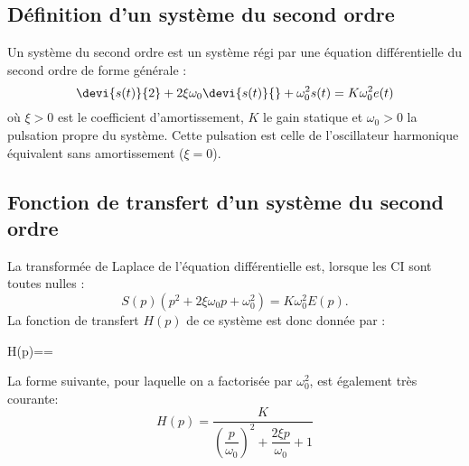 \subsection{Définition d'un système du second ordre}
Un système du second ordre est un système régi par une équation 
différentielle du second ordre de forme générale :
\[
\devi{s(t)}{2}+2\xi\omega_0\devi{s(t)}{}+\omega^2_0s(t)=K\omega^2_0e(t)
\]
où $\xi>0$ est le coefficient d'amortissement, $K$ le gain statique et 
$\omega_0>0$ la pulsation propre du système. Cette pulsation est celle de 
l'oscillateur harmonique équivalent sans amortissement ($\xi=0$).
\subsection{Fonction de transfert d'un système du second ordre}
La transformée de Laplace de l'équation différentielle est, lorsque les CI 
sont toutes nulles :
\[
S(p)\left(p^2+2\xi\omega_0p+\omega^2_0\right)=K\omega^2_0E(p).
\]
La fonction de transfert $H(p)$ de ce système est donc donnée par :
\begin{bequation}
    H(p)==
    \label{eq-2nd_ft}
\end{bequation}
La forme suivante, pour laquelle on a factorisée par $\omega^2_0$, est 
également très courante:
\[
H(p)=\dfrac{K}{\left(\dfrac{p}{\omega_0}\right)^2
    +\dfrac{2\xi p}{\omega_0}+1}
\]
